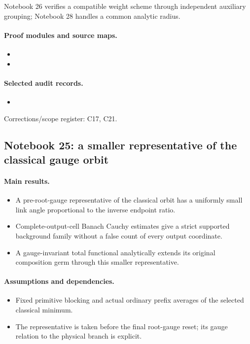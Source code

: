 \documentclass[11pt]{article}
\theoremstyle{remark}
\begin{document}
Notebook 26 verifies a compatible weight scheme through independent auxiliary grouping; Notebook 28 handles a common analytic radius.

\paragraph{Proof modules and source maps.}
\begingroup\small
\begin{itemize}
\item {}
\item {}
\end{itemize}
\endgroup

\paragraph{Selected audit records.}
\begingroup\small
\begin{itemize}
\item {}
\end{itemize}
\endgroup
Corrections/scope register: C17, C21.\par

\subsection{Notebook 25: a smaller representative of the classical gauge orbit}
\label{hnc-25}
\noindent{}\par

\paragraph{Main results.}
\begin{itemize}
\item A pre-root-gauge representative of the classical orbit has a uniformly small link angle proportional to the inverse endpoint ratio.
\item Complete-output-cell Banach Cauchy estimates give a strict supported background family without a false count of every output coordinate.
\item A gauge-invariant total functional analytically extends its original composition germ through this smaller representative.
\end{itemize}

\paragraph{Assumptions and dependencies.}
\begin{itemize}
\item Fixed primitive blocking and actual ordinary prefix averages of the selected classical minimum.
\item The representative is taken before the final root-gauge reset; its gauge relation to the physical branch is explicit.
\end{itemize}
\end{document}
